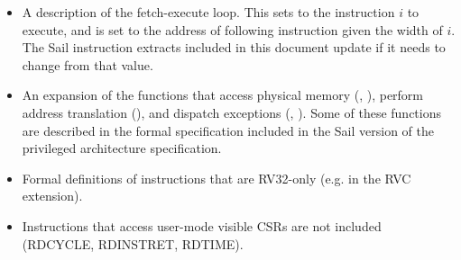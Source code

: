 \begin{itemize}
\item A description of the fetch-execute loop.  This sets 
  to the instruction $i$ to execute, and  is set to the
  address of following instruction given the width of $i$.  The Sail
  instruction extracts included in this document update
   if it needs to change from that value.
\item An expansion of the functions that access physical memory
  (, ), perform
  address translation (), and dispatch
  exceptions (,
  ).  Some of these functions are
  described in the formal specification included in the Sail version
  of the privileged architecture specification.
\item Formal definitions of instructions that are RV32-only (e.g. in
  the RVC extension).
\item Instructions that access user-mode visible CSRs are not included
  (RDCYCLE, RDINSTRET, RDTIME).
\end{itemize}
